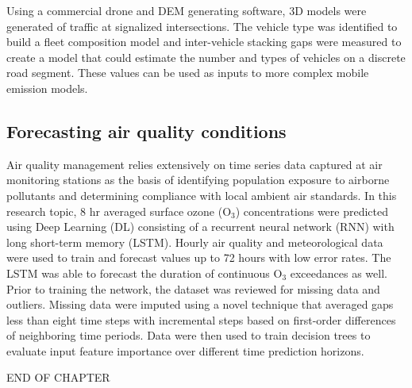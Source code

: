 Using a commercial drone and DEM generating software, 3D models were generated of traffic at signalized intersections. The vehicle type was identified to build a fleet composition model and inter-vehicle stacking gaps were measured to create a model that could estimate the number and types of vehicles on a discrete road segment. These values can be used as inputs to more complex mobile emission models.

\subsection{Forecasting air quality conditions}

Air quality management relies extensively on time series data captured at air monitoring stations as the basis of identifying population exposure to airborne pollutants and determining compliance with local ambient air standards. In this research topic, 8 hr averaged surface ozone (O$_{3}$) concentrations were predicted using Deep Learning (DL) consisting of a recurrent neural network (RNN) with long short-term memory (LSTM). Hourly air quality and meteorological data were used to train and forecast values up to 72 hours with low error rates. The LSTM was able to forecast the duration of continuous O$_{3}$ exceedances as well. Prior to training the network, the dataset was reviewed for missing data and outliers. Missing data were imputed using a novel technique that averaged gaps less than eight time steps with incremental steps based on first-order differences of neighboring time periods. Data were then used to train decision trees to evaluate input feature importance over different time prediction horizons. 

%

\bigskip
\begin{center}
END OF CHAPTER
\end{center}
